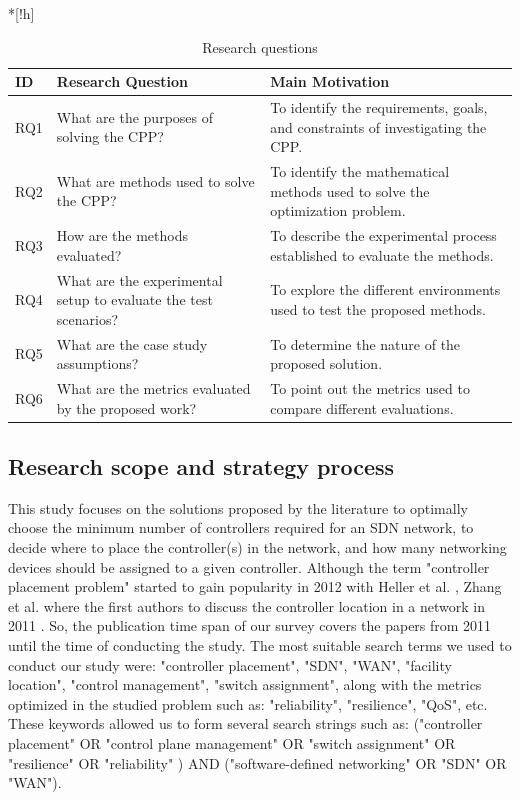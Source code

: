 \documentclass{IEEEtran}
\begin{document}
\begin{table}*[!h]
    \centering
    \begin{tabular}{l p{4.5cm} p{6cm} }
  \hline
  ID & Research Question & Main Motivation \\
  \hline
  RQ1 & What are the purposes of solving the CPP? & To identify the requirements, goals, and constraints of investigating the CPP. \\
  RQ2 & What are methods used to solve the CPP? & To identify the mathematical methods used to solve the optimization problem. \\
  RQ3 & How are the methods evaluated? & To describe the experimental process established to evaluate the methods. \\
  RQ4 & What are the experimental setup to evaluate the test scenarios? & To explore the different environments used to test the proposed methods. \\
  RQ5 & What are the case study assumptions? & To determine the nature of the proposed solution. \\
  RQ6 & What are the metrics evaluated by the proposed work? & To point out the metrics used to compare different evaluations. \\
  \hline
\end{tabular}
    \caption{Research questions}
    \label{tab:QRs}
\end{table}


\subsection{Research scope and strategy process}
This study focuses on the solutions proposed by the literature to optimally choose the minimum number of controllers required for an SDN network, to decide where to place the controller(s) in the network, and how many networking devices should be assigned to a given controller. Although the term "controller placement problem" started to gain popularity in 2012 with Heller et al. \cite{HeSh12}, Zhang et al. where the first authors to discuss the controller location in a network in 2011 \cite{ZhBe11}. So, the publication time span of our survey covers the papers from 2011 until the time of conducting the study. The most suitable search terms we used to conduct our study were: "controller placement", "SDN", "WAN", "facility location", "control management", "switch assignment", along with the metrics optimized in the studied problem such as: "reliability", "resilience", "QoS", etc. These keywords allowed us to form several search strings such as: ("controller placement" OR "control plane management" OR "switch assignment" OR  "resilience" OR "reliability" ) AND ("software-defined networking" OR "SDN" OR  "WAN"). 
\end{document}
